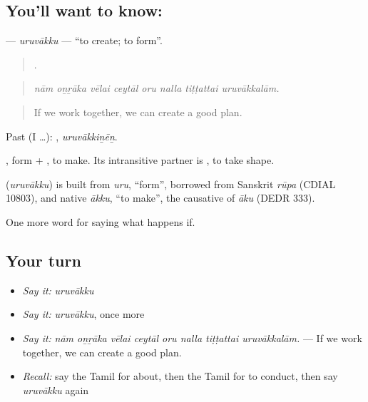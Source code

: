 \subsection*{You'll want to know: }
\textbf{} — \emph{uruvākku} — \textquotedblleft{}to create; to form\textquotedblright{}.

\begin{quote}
       .
\end{quote}

\begin{quote}
\emph{nām oṉṟāka vēlai ceytāl oru nalla tiṭṭattai uruvākkalām.}
\end{quote}

\begin{quote}
If we work together, we can create a good plan.
\end{quote}

Past (I …): , \emph{uruvākkiṉēṉ}.

, form + , to make. Its intransitive partner is , to take shape.

\begin{cousinweb}
\textbf{} (\emph{uruvākku}) is built from \emph{uru}, \textquotedblleft{}form\textquotedblright{}, borrowed from Sanskrit \emph{rūpa} (CDIAL 10803), and native \emph{ākku}, \textquotedblleft{}to make\textquotedblright{}, the causative of \emph{āku} (DEDR 333).
\end{cousinweb}

\begin{grammarlens}[title={What you've built}]
One more word for saying what happens if.
\end{grammarlens}

\subsection*{Your turn}
\begin{itemize}
\raggedright
  \item \emph{Say it:} \emph{uruvākku}
  \item \emph{Say it:} \emph{uruvākku}, once more
  \item \emph{Say it:} \emph{nām oṉṟāka vēlai ceytāl oru nalla tiṭṭattai uruvākkalām.} — If we work together, we can create a good plan.
  \item \emph{Recall:} say the Tamil for about, then the Tamil for to conduct, then say \emph{uruvākku} again
\end{itemize}

